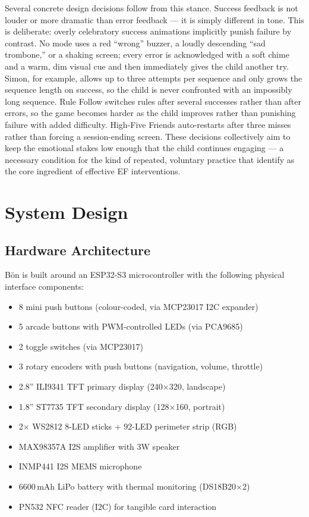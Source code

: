\documentclass[12pt, a4paper]{article}
\newcommand{\Bodn}{B\"o\dh{}n}
\begin{document}
Several concrete design decisions follow from this stance. Success feedback is
not louder or more dramatic than error feedback --- it is simply different in
tone. This is deliberate: overly celebratory success animations implicitly
punish failure by contrast. No mode uses a red ``wrong'' buzzer, a loudly
descending ``sad trombone,'' or a shaking screen; every error is acknowledged
with a soft chime and a warm, dim visual cue and then immediately gives the
child another try. Simon, for example, allows up to three attempts per
sequence and only grows the sequence length on success, so the child is never
confronted with an impossibly long sequence. Rule Follow switches rules after
several successes rather than after errors, so the game becomes harder as the
child improves rather than punishing failure with added difficulty. High-Five
Friends auto-restarts after three misses rather than forcing a session-ending
screen. These decisions collectively aim to keep the emotional stakes low
enough that the child continues engaging --- a necessary condition for the
kind of repeated, voluntary practice that \citet{diamond2016conclusions}
identify as the core ingredient of effective EF interventions.

\section{System Design}
\label{sec:system}

\subsection{Hardware Architecture}
\label{sec:hardware}

\Bodn{} is built around an ESP32-S3 microcontroller with the following physical
interface components:

\begin{itemize}[noitemsep]
  \item 8 mini push buttons (colour-coded, via MCP23017 I2C expander)
  \item 5 arcade buttons with PWM-controlled LEDs (via PCA9685)
  \item 2 toggle switches (via MCP23017)
  \item 3 rotary encoders with push buttons (navigation, volume, throttle)
  \item 2.8'' ILI9341 TFT primary display (240$\times$320, landscape)
  \item 1.8'' ST7735 TFT secondary display (128$\times$160, portrait)
  \item 2$\times$ WS2812 8-LED sticks + 92-LED perimeter strip (RGB)
  \item MAX98357A I2S amplifier with 3W speaker
  \item INMP441 I2S MEMS microphone
  \item 6600\,mAh LiPo battery with thermal monitoring (DS18B20$\times$2)
  \item PN532 NFC reader (I2C) for tangible card interaction
\end{itemize}
\end{document}
